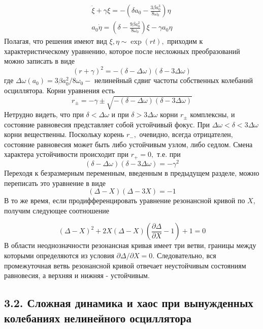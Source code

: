 \documentclass[11pt]{article}
\begin{document}
\[
\begin{array}{l}
\dot{\xi}+\gamma \xi=-\left(\delta a_{0}-\frac{3 \beta a_{0}^{3}}{8 \omega_{0}}\right) \eta \\
a_{0} \dot{\eta}=\left(\delta-\frac{9 \beta a_{0}^{2}}{8 \omega_{0}}\right) \xi-\gamma a_{0} \eta
\end{array}
\] Полагая, что решения имеют вид \(\xi, \eta \sim \exp (r t),\)
приходим к характеристическому уравнению, которое после несложных
преобразований можно записать в виде \[
(r+\gamma)^{2}=-(\delta-\Delta \omega)(\delta-3 \Delta \omega)
\] где
\(\Delta \omega\left(a_{0}\right)=3 \beta a_{0}^{2} / 8 \omega_{0}-\)
нелинейный сдвиг частоты собственных колебаний осциллятора. Корни
уравнения есть \[
r_{\pm}=-\gamma \pm \sqrt{-(\delta-\Delta \omega)(\delta-3 \Delta \omega)}
\] Нетрудно видеть, что при \(\delta<\Delta \omega\) и при
\(\delta>3 \Delta \omega\) корни \(r_{\pm}\) комплексны, и состояние
равновесия представляет собой устойчивый фокус. При
\(\Delta \omega<\delta<3 \Delta \omega\) корни вещественны. Поскольку
корень \(r_{-},\) очевидно, всегда отрицателен, состояние равновесия
может быть либо устойчивым узлом, либо седлом. Смена характера
устойчивости происходит при \(r_{+}=0,\) т.е. при \[
(\delta-\Delta \omega)(\delta-3 \Delta \omega)=-\gamma^{2}
\] Переходя к безразмерным переменным, введенным в предыдущем разделе,
можно переписать это уравнение в виде \[
(\Delta-X)(\Delta-3 X)=-1
\] В то же время, если продифференцировать уравнение резонансной кривой
по \(X\), получим следующее соотношение

\[
(\Delta-X)^{2}+2 X(\Delta-X)\left(\frac{\partial \Delta}{\partial X}-1\right)+1=0
\] В области неоднозначности резонансная кривая имеет три ветви, границы
между которыми определяются из условия
\(\partial \Delta / \partial X=0 .\) Следовательно, вся промежуточная
ветвь резонансной кривой отвечает неустойчивым состояниям равновесия, а
верхняя и нижняя - устойчивым.

    \hypertarget{ux441ux43bux43eux436ux43dux430ux44f-ux434ux438ux43dux430ux43cux438ux43aux430-ux438-ux445ux430ux43eux441-ux43fux440ux438-ux432ux44bux43dux443ux436ux434ux435ux43dux43dux44bux445-ux43aux43eux43bux435ux431ux430ux43dux438ux44fux445-ux43dux435ux43bux438ux43dux435ux439ux43dux43eux433ux43e-ux43eux441ux446ux438ux43bux43bux44fux442ux43eux440ux430}{%
\subsection{3.2. Сложная динамика и хаос при вынужденных колебаниях
нелинейного
осциллятора}\label{ux441ux43bux43eux436ux43dux430ux44f-ux434ux438ux43dux430ux43cux438ux43aux430-ux438-ux445ux430ux43eux441-ux43fux440ux438-ux432ux44bux43dux443ux436ux434ux435ux43dux43dux44bux445-ux43aux43eux43bux435ux431ux430ux43dux438ux44fux445-ux43dux435ux43bux438ux43dux435ux439ux43dux43eux433ux43e-ux43eux441ux446ux438ux43bux43bux44fux442ux43eux440ux430}}
\end{document}
